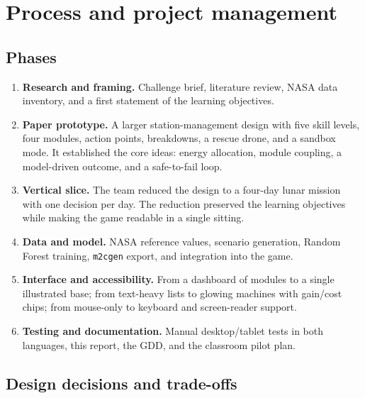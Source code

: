 \documentclass[11pt,a4paper]{article}
\newcommand{\code}[1]{\texttt{#1}}
\begin{document}
\section{Process and project management}

\subsection{Phases}

\begin{enumerate}
  \item \textbf{Research and framing.} Challenge brief, literature review, NASA data inventory, and a first statement of the learning objectives.
  \item \textbf{Paper prototype.} A larger station-management design with five skill levels, four modules, action points, breakdowns, a rescue drone, and a sandbox mode. It established the core ideas: energy allocation, module coupling, a model-driven outcome, and a safe-to-fail loop.
  \item \textbf{Vertical slice.} The team reduced the design to a four-day lunar mission with one decision per day. The reduction preserved the learning objectives while making the game readable in a single sitting.
  \item \textbf{Data and model.} NASA reference values, scenario generation, Random Forest training, \code{m2cgen} export, and integration into the game.
  \item \textbf{Interface and accessibility.} From a dashboard of modules to a single illustrated base; from text-heavy lists to glowing machines with gain/cost chips; from mouse-only to keyboard and screen-reader support.
  \item \textbf{Testing and documentation.} Manual desktop/tablet tests in both languages, this report, the GDD, and the classroom pilot plan.
\end{enumerate}

\subsection{Design decisions and trade-offs}
\end{document}
